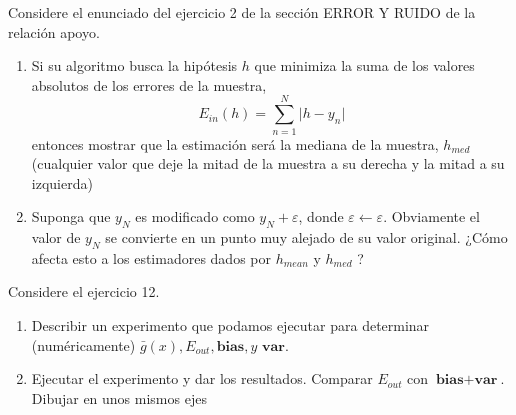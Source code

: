 \documentclass[11pt,leqno]{article}
\theoremstyle{definition}
\begin{document}
\begin{cuestionopcional}
Considere el enunciado del ejercicio 2 de la sección ERROR Y RUIDO de la
relación apoyo.
\begin{enumerate}[a]
\item Si su algoritmo busca la hipótesis $h$ que minimiza la suma de los valores absolutos de los errores de la muestra,
 \[ E_{in}(h) = \sum\limits_{n=1}^N \vert h - y_n \vert \]
entonces mostrar que la estimación será la mediana de la muestra, $h_{med}$ (cualquier valor que deje la mitad de la muestra a su derecha y la mitad a su izquierda)
\item Suponga que $y_N$ es modificado como $y_N + \varepsilon$, donde $\varepsilon \leftarrow \varepsilon$. Obviamente el valor de $y_N$ se convierte en un punto muy alejado de su valor original. ¿Cómo afecta esto a los estimadores dados por $h_{mean}$ y $h_{med}$ ?
\end{enumerate}
\end{cuestionopcional}

\begin{cuestionopcional}
Considere el ejercicio 12.
\begin{enumerate}
\item Describir un experimento que podamos ejecutar para determinar (numéricamente) $\bar{g}(x), E_{out}, \textbf{bias}, y \textbf{ var}.$
\item Ejecutar el experimento y dar los resultados. Comparar $E_{out}$ con $ \textbf{bias} + \textbf{var}$. Dibujar en unos mismos ejes 
\end{enumerate}
\end{cuestionopcional}
\end{document}
